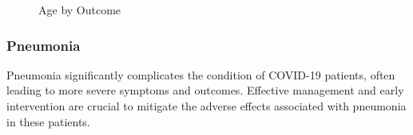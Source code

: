 \begin{figure}[H]%
    \caption{Age by Outcome}%
    \label{fig:age_insights_outcome}%
    \centering
    \qquad
    \qquad
\end{figure}

\subsubsection{Pneumonia}

Pneumonia significantly complicates the condition of COVID-19 patients, often
leading to more severe symptoms and outcomes. Effective management and early 
intervention are crucial to mitigate the adverse effects associated with pneumonia
in these patients.

